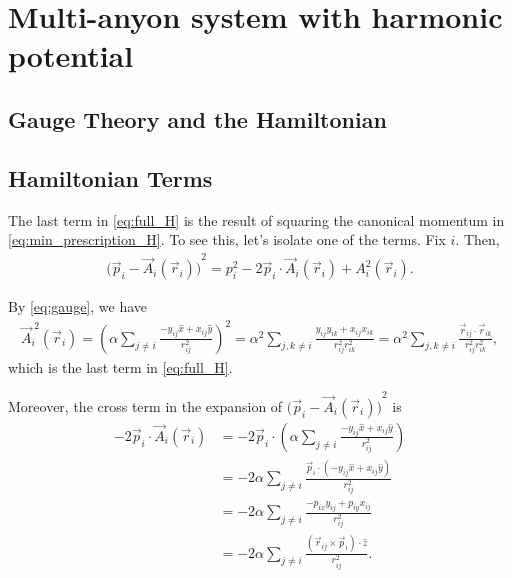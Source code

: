 \chapter{Multi-anyon system with harmonic potential}\label{ch:Appendix_multi_anyon}
\section{Gauge Theory and the Hamiltonian}

\section{Hamiltonian Terms}
The last term in \cref{eq:full_H} is the result of squaring the canonical momentum in \cref{eq:min_prescription_H}. To see this, let's isolate one of the terms. Fix $i$. Then,
\begin{align*}
    {\bigl(\vec{p}_i - \vec{A}_i(\vec{r}_i)\bigr)}^2 = {p}_i^{2} - 2\vec{p}_i\cdot\vec{A}_i(\vec{r}_i) + {A}_i^{2}(\vec{r}_i).
\end{align*}

By \cref{eq:gauge}, we have
\begin{align*}
    \vec{A}_i^{\;2}(\vec{r}_i) = {\left( \alpha\sum_{j\neq i}\frac{-y_{ij}\hat{x} + x_{ij}\hat{y}}{r_{ij}^2} \right)}^2 = \alpha^2\sum_{j,k\neq i}\frac{y_{ij}y_{ik} + x_{ij}x_{ik}}{r_{ij}^2r_{ik}^2} = \alpha^2\sum_{j,k\neq i}\frac{\vec{r}_{ij}\cdot\vec{r}_{ik}}{r_{ij}^2r_{ik}^2},
\end{align*}
which is the last term in \cref{eq:full_H}.

Moreover, the cross term in the expansion of ${\bigl(\vec{p}_i - \vec{A}_i(\vec{r}_i)\bigr)}^2$ is
\begin{align*}
    -2\vec{p}_i\cdot\vec{A}_i(\vec{r}_i) &= -2\vec{p}_i\cdot\left( \alpha\sum_{j\neq i}\frac{-y_{ij}\hat{x} + x_{ij}\hat{y}}{r_{ij}^2} \right) \\
    &= -2\alpha\sum_{j\neq i}\frac{\vec{p}_i\cdot\left( -y_{ij}\hat{x} + x_{ij}\hat{y} \right)}{r_{ij}^2} \\
    &= -2\alpha\sum_{j\neq i}\frac{-p_{ix}y_{ij} + p_{iy}x_{ij}}{r_{ij}^2} \\
    &= -2\alpha\sum_{j\neq i}\frac{(\vec{r}_{ij}\times\vec{p}_i)\cdot\hat{z}}{r_{ij}^2}.
\end{align*}

